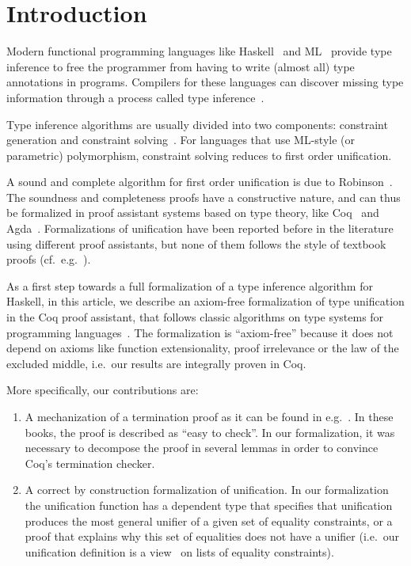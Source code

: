 \section{Introduction}

Modern functional programming languages like Haskell~
and ML~ provide type inference to free the programmer
from having to write (almost all) type annotations in
programs. Compilers for these languages can discover missing type
information through a process called type inference~.

Type inference algorithms are usually divided into two components:
constraint generation and constraint solving~. For
languages that use ML-style (or parametric) polymorphism, constraint
solving reduces to first order unification.

A sound and complete algorithm for first order unification is due to
Robinson~.  The soundness and completeness proofs
have a constructive nature, and can thus be formalized in proof
assistant systems based on type theory, like Coq~ and
Agda~. Formalizations of unification have been reported
before in the literature~
using different proof assistants, but none of them follows the style
of textbook proofs (cf.~e.g.~).

As a first step towards a full formalization of a type inference
algorithm for Haskell, in this article, we describe
an axiom-free formalization of type unification in the Coq proof
assistant, that follows classic algorithms on type systems for
programming languages~.  The formalization
is ``axiom-free'' because it does not depend on axioms like function
extensionality, proof irrelevance or the law of the excluded middle,
i.e.~our results are integrally proven in Coq.

More specifically, our contributions are:
\begin{enumerate}

  \item A mechanization of a termination proof as it can be found in
    e.g.~.  In these books, the proof is
    described as ``easy to check''. In our formalization, it was
    necessary to decompose the proof in several lemmas in order to
    convince Coq's termination checker.

  \item A correct by construction formalization of unification. In our
    formalization the unification function has a dependent type that
    specifies that unification produces the most general unifier of a
    given set of equality constraints, or a proof that explains why
    this set of equalities does not have a unifier (i.e.~our
    unification definition is a view~ on lists of
    equality constraints).
\end{enumerate}

